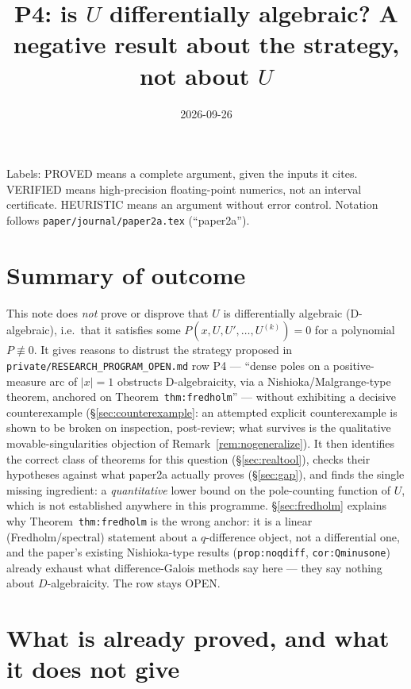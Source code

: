 \documentclass[11pt]{article}
\title{P4: is $U$ differentially algebraic? A negative result about the strategy, not about $U$}
\date{2026-09-26}
\theoremstyle{remark}
\begin{document}
\maketitle

\noindent Labels: PROVED means a complete argument, given the inputs it cites. VERIFIED means
high-precision floating-point numerics, not an interval certificate. HEURISTIC means an argument
without error control. Notation follows \texttt{paper/journal/paper2a.tex} (``paper2a'').

\section*{Summary of outcome}

This note does \emph{not} prove or disprove that $U$ is differentially algebraic (D-algebraic),
i.e.\ that it satisfies some
$P(x,U,U',\ldots,U^{(k)})=0$ for a polynomial $P\not\equiv0$. It gives reasons to distrust the strategy
proposed in \texttt{private/RESEARCH\_PROGRAM\_OPEN.md} row P4 --- ``dense poles on a positive-measure
arc of $|x|=1$ obstructs D-algebraicity, via a Nishioka/Malgrange-type theorem, anchored on
Theorem~\texttt{thm:fredholm}'' --- without exhibiting a decisive counterexample
(\S\ref{sec:counterexample}: an attempted explicit counterexample is shown to be broken on inspection,
post-review; what survives is the qualitative movable-singularities objection of
Remark~\ref{rem:nogeneralize}). It then identifies the correct class of theorems for this question
(\S\ref{sec:realtool}), checks their hypotheses against what paper2a actually proves
(\S\ref{sec:gap}), and finds the single missing ingredient: a \emph{quantitative} lower bound on the
pole-counting function of $U$, which is not established anywhere in this programme. \S\ref{sec:fredholm}
explains why Theorem~\texttt{thm:fredholm} is the wrong anchor: it is a linear (Fredholm/spectral)
statement about a $q$-difference object, not a differential one, and the paper's existing
Nishioka-type results (\texttt{prop:noqdiff}, \texttt{cor:Qminusone}) already exhaust what
difference-Galois methods say here --- they say nothing about $D$-algebraicity. The row stays OPEN.

\section{What is already proved, and what it does not give}\label{sec:proved}
\end{document}
